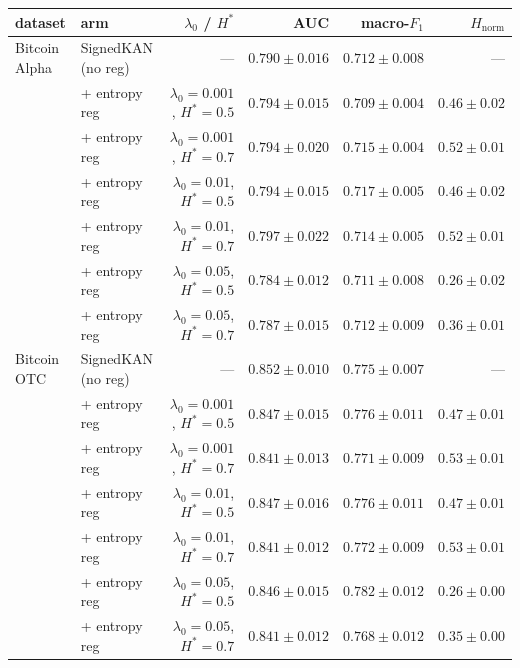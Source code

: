 \begin{tabular}{@{}llrrrr@{}}
\toprule
dataset & arm & $\lambda_0$ / $H^*$ & AUC & macro-$F_1$ & $H_{\mathrm{norm}}$ \\
\midrule
Bitcoin Alpha & SignedKAN (no reg) & --- & $0.790\pm0.016$ & $0.712\pm0.008$ & --- \\
 & + entropy reg & $\lambda_0\!=\!0.001$, $H^*\!=\!0.5$ & $0.794\pm0.015$ & $0.709\pm0.004$ & $0.46\pm0.02$ \\
 & + entropy reg & $\lambda_0\!=\!0.001$, $H^*\!=\!0.7$ & $0.794\pm0.020$ & $0.715\pm0.004$ & $0.52\pm0.01$ \\
 & + entropy reg & $\lambda_0\!=\!0.01$, $H^*\!=\!0.5$ & $0.794\pm0.015$ & $0.717\pm0.005$ & $0.46\pm0.02$ \\
 & + entropy reg & $\lambda_0\!=\!0.01$, $H^*\!=\!0.7$ & $0.797\pm0.022$ & $0.714\pm0.005$ & $0.52\pm0.01$ \\
 & + entropy reg & $\lambda_0\!=\!0.05$, $H^*\!=\!0.5$ & $0.784\pm0.012$ & $0.711\pm0.008$ & $0.26\pm0.02$ \\
 & + entropy reg & $\lambda_0\!=\!0.05$, $H^*\!=\!0.7$ & $0.787\pm0.015$ & $0.712\pm0.009$ & $0.36\pm0.01$ \\
\midrule
Bitcoin OTC & SignedKAN (no reg) & --- & $0.852\pm0.010$ & $0.775\pm0.007$ & --- \\
 & + entropy reg & $\lambda_0\!=\!0.001$, $H^*\!=\!0.5$ & $0.847\pm0.015$ & $0.776\pm0.011$ & $0.47\pm0.01$ \\
 & + entropy reg & $\lambda_0\!=\!0.001$, $H^*\!=\!0.7$ & $0.841\pm0.013$ & $0.771\pm0.009$ & $0.53\pm0.01$ \\
 & + entropy reg & $\lambda_0\!=\!0.01$, $H^*\!=\!0.5$ & $0.847\pm0.016$ & $0.776\pm0.011$ & $0.47\pm0.01$ \\
 & + entropy reg & $\lambda_0\!=\!0.01$, $H^*\!=\!0.7$ & $0.841\pm0.012$ & $0.772\pm0.009$ & $0.53\pm0.01$ \\
 & + entropy reg & $\lambda_0\!=\!0.05$, $H^*\!=\!0.5$ & $0.846\pm0.015$ & $0.782\pm0.012$ & $0.26\pm0.00$ \\
 & + entropy reg & $\lambda_0\!=\!0.05$, $H^*\!=\!0.7$ & $0.841\pm0.012$ & $0.768\pm0.012$ & $0.35\pm0.00$ \\
\bottomrule
\end{tabular}
